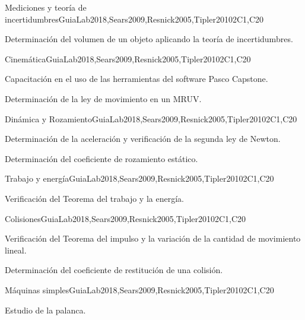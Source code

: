 \begin{syllabus}
\begin{unit}{Mediciones y teoría de incertidumbres}{}{GuiaLab2018,Sears2009,Resnick2005,Tipler2010}{2}{C1,C20}
\begin{topics}
      \item Determinación del volumen de un objeto aplicando la teoría de incertidumbres.
\end{topics}
\end{unit}

\begin{unit}{Cinemática}{}{GuiaLab2018,Sears2009,Resnick2005,Tipler2010}{2}{C1,C20}
\begin{topics}
      \item Capacitación en el uso de las herramientas del software Pasco Capstone.
      \item Determinación de la ley de movimiento en un MRUV.
\end{topics}
\end{unit}

\begin{unit}{Dinámica y Rozamiento}{}{GuiaLab2018,Sears2009,Resnick2005,Tipler2010}{2}{C1,C20}
\begin{topics}
      \item Determinación de la aceleración y verificación de la segunda ley de Newton. 
      \item Determinación del coeficiente de rozamiento estático.
\end{topics}
\end{unit}

\begin{unit}{Trabajo y energía}{}{GuiaLab2018,Sears2009,Resnick2005,Tipler2010}{2}{C1,C20}
\begin{topics}
      \item Verificación del Teorema del trabajo y la energía.
   \end{topics}
\end{unit}

\begin{unit}{Colisiones}{}{GuiaLab2018,Sears2009,Resnick2005,Tipler2010}{2}{C1,C20}
\begin{topics}
	\item Verificación del Teorema del impulso y la variación de la cantidad de movimiento lineal. 
	\item Determinación del coeficiente de restitución de una colisión.
   \end{topics}
\end{unit}

\begin{unit}{Máquinas simples}{}{GuiaLab2018,Sears2009,Resnick2005,Tipler2010}{2}{C1,C20}
   \begin{topics}
	\item Estudio de la palanca.
   \end{topics}
\end{unit}



\begin{coursebibliography}
\end{coursebibliography}

\end{syllabus}
